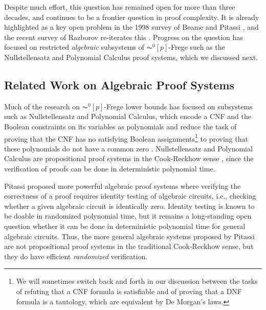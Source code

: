 \documentclass[11pt,letter]{article}
\theoremstyle{remark} %
\begin{document}
    Despite much effort, this question has remained open for more than three decades, and continues to be a frontier question in proof complexity. It is already highlighted as a key open problem in the 1998 survey of Beame and Pitassi \cite{BP98}, and the recent survey of Razborov re-iterates this \cite{Razb16}. Progress on the question has focused on restricted \emph{algebraic} subsystems of $\AC^0[p]$-Frege such as the Nullstellensatz \cite{BeameIKPP96} and Polynomial Calculus \cite{CEI96} proof systems, which we discussed next.\vspace{-4pt} 



\subsection{Related Work on Algebraic Proof Systems}
    
    Much of the research on $\AC^0[p]$-Frege lower bounds has focused on subsystems such as Nullstellensatz and Polynomial Calculus, which encode a CNF and the Boolean constraints on its variables as polynomials and reduce the task of proving that the CNF has no satisfying Boolean assignments\footnote{We will sometimes switch back and forth in our discussion between the tasks of refuting that a CNF formula is satisfiable and of proving that a DNF formula is a tautology, which are equivalent by De Morgan's laws.} to proving that these polynomials do not have a common zero \cite{BeameIKPP96,BussIKPRS96}. Nullstellensatz and Polynomial Calculus are propositional proof systems in the Cook-Reckhow sense \cite{CR79}, since the verification of proofs can be done in deterministic polynomial time.

    Pitassi \cite{Pit97} proposed  more powerful algebraic proof systems where verifying the correctness of a proof requires identity testing of algebraic circuits, i.e., checking whether a given algebraic circuit is identically zero. Identity testing is known to be doable in randomized polynomial time, but it remains a long-standing open question whether it can be done in deterministic polynomial time for general algebraic circuits. Thus, the more general algebraic systems proposed by Pitassi are not propositional proof systems in the traditional Cook-Reckhow sense, but they do have efficient {\it randomized} verification.
\end{document}
